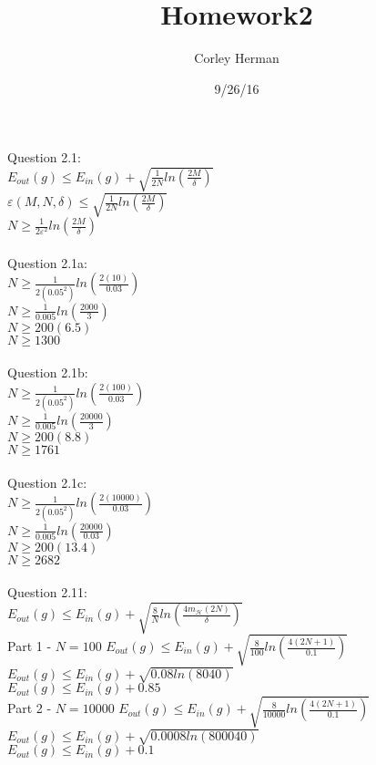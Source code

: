 \documentclass[a4paper]{article}
\title{Homework2}
\author{Corley Herman}
\date{9/26/16}
\begin{document}
\lstset{language=Python}

\maketitle

\noindent Question 2.1:\\
$E_{out}(g)\leq E_{in}(g)+\sqrt{\frac{1}{2N}ln(\frac{2M}{\delta})}$\\
$\varepsilon(M,N,\delta)\leq\sqrt{\frac{1}{2N}ln(\frac{2M}{\delta})}$\\
$N\geq\frac{1}{2\varepsilon^2}ln(\frac{2M}{\delta})$\\
\\
Question 2.1a:\\
$N\geq\frac{1}{2(0.05^2)}ln(\frac{2(10)}{0.03})$\\
$N\geq\frac{1}{0.005}ln(\frac{2000}{3})$\\
$N\geq200(6.5)$\\
$N\geq1300$\\
\\
Question 2.1b:\\
$N\geq\frac{1}{2(0.05^2)}ln(\frac{2(100)}{0.03})$\\
$N\geq\frac{1}{0.005}ln(\frac{20000}{3})$\\
$N\geq200(8.8)$\\
$N\geq1761$\\
\\
Question 2.1c:\\
$N\geq\frac{1}{2(0.05^2)}ln(\frac{2(10000)}{0.03})$\\
$N\geq\frac{1}{0.005}ln(\frac{20000}{0.03})$\\
$N\geq200(13.4)$\\
$N\geq2682$\\
\\
Question 2.11:\\
$E_{out}(g)\leq E_{in}(g)+\sqrt{\frac{8}{N}ln(\frac{4m_\mathcal{H}(2N)}{\delta})}$\\
Part 1 - $N=100$
$E_{out}(g)\leq E_{in}(g)+\sqrt{\frac{8}{100}ln(\frac{4(2N+1)}{0.1})}$\\
$E_{out}(g)\leq E_{in}(g)+\sqrt{0.08ln(8040)}$\\
$E_{out}(g)\leq E_{in}(g)+0.85$\\
Part 2 - $N=10000$
$E_{out}(g)\leq E_{in}(g)+\sqrt{\frac{8}{10000}ln(\frac{4(2N+1)}{0.1})}$\\
$E_{out}(g)\leq E_{in}(g)+\sqrt{0.0008ln(800040)}$\\
$E_{out}(g)\leq E_{in}(g)+0.1$\\
\end{document}

